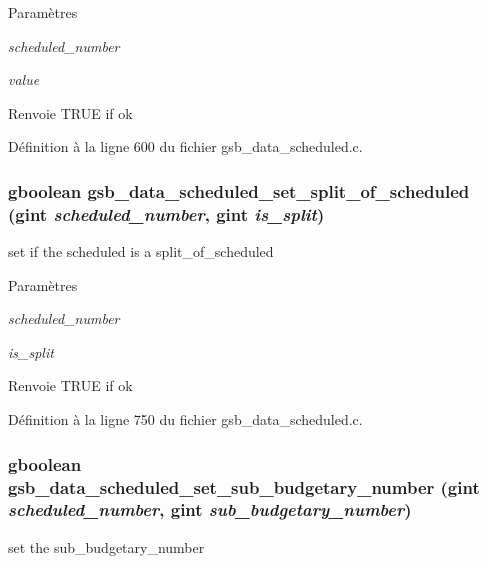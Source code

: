\begin{DoxyParams}{Paramètres}
\item[{\em scheduled\_\-number}]\item[{\em value}]\end{DoxyParams}
\begin{DoxyReturn}{Renvoie}
TRUE if ok 
\end{DoxyReturn}


Définition à la ligne 600 du fichier gsb\_\-data\_\-scheduled.c.

\subsubsection[{gsb\_\-data\_\-scheduled\_\-set\_\-split\_\-of\_\-scheduled}]{\setlength{\rightskip}{0pt plus 5cm}gboolean gsb\_\-data\_\-scheduled\_\-set\_\-split\_\-of\_\-scheduled (gint {\em scheduled\_\-number}, \/  gint {\em is\_\-split})}\label{gsb__data__scheduled_8h_a99239d1e344d4e3d86a28c95632ab234}
set if the scheduled is a split\_\-of\_\-scheduled 
\begin{DoxyParams}{Paramètres}
\item[{\em scheduled\_\-number}]\item[{\em is\_\-split}]\end{DoxyParams}
\begin{DoxyReturn}{Renvoie}
TRUE if ok 
\end{DoxyReturn}


Définition à la ligne 750 du fichier gsb\_\-data\_\-scheduled.c.

\subsubsection[{gsb\_\-data\_\-scheduled\_\-set\_\-sub\_\-budgetary\_\-number}]{\setlength{\rightskip}{0pt plus 5cm}gboolean gsb\_\-data\_\-scheduled\_\-set\_\-sub\_\-budgetary\_\-number (gint {\em scheduled\_\-number}, \/  gint {\em sub\_\-budgetary\_\-number})}\label{gsb__data__scheduled_8h_a8bf824ef47fb1e26554ac1c4b7df2438}
set the sub\_\-budgetary\_\-number


